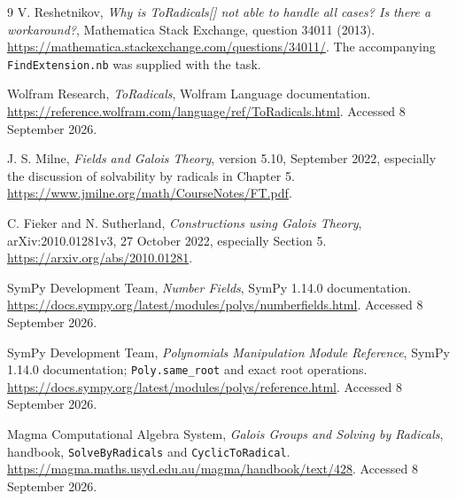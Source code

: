 \documentclass[11pt,letterpaper]{article}
\theoremstyle{definition}\newtheorem{definition}[theorem]{Definition}
\theoremstyle{remark}\newtheorem{remark}[theorem]{Remark}
\begin{document}
\begin{thebibliography}{9}
V. Reshetnikov, \emph{Why is ToRadicals[] not able to handle all cases? Is there
a workaround?}, Mathematica Stack Exchange, question 34011 (2013).
\url{https://mathematica.stackexchange.com/questions/34011/}.
The accompanying \texttt{FindExtension.nb} was supplied with the task.

Wolfram Research, \emph{ToRadicals}, Wolfram Language documentation.
\url{https://reference.wolfram.com/language/ref/ToRadicals.html}.
Accessed 8 September 2026.

J. S. Milne, \emph{Fields and Galois Theory}, version 5.10, September 2022,
especially the discussion of solvability by radicals in Chapter 5.
\url{https://www.jmilne.org/math/CourseNotes/FT.pdf}.

C. Fieker and N. Sutherland, \emph{Constructions using Galois Theory},
arXiv:2010.01281v3, 27 October 2022, especially Section 5.
\url{https://arxiv.org/abs/2010.01281}.

SymPy Development Team, \emph{Number Fields}, SymPy 1.14.0 documentation.
\url{https://docs.sympy.org/latest/modules/polys/numberfields.html}.
Accessed 8 September 2026.

SymPy Development Team, \emph{Polynomials Manipulation Module Reference},
SymPy 1.14.0 documentation; \texttt{Poly.same\_root} and exact root operations.
\url{https://docs.sympy.org/latest/modules/polys/reference.html}.
Accessed 8 September 2026.

Magma Computational Algebra System, \emph{Galois Groups and Solving by
Radicals}, handbook, \texttt{SolveByRadicals} and \texttt{CyclicToRadical}.
\url{https://magma.maths.usyd.edu.au/magma/handbook/text/428}.
Accessed 8 September 2026.
\end{thebibliography}
\end{document}

